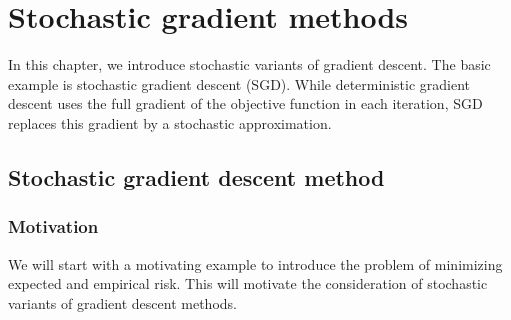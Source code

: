 \documentclass[12pt,openany]{book}
\theoremstyle{definition}
\theoremstyle{definition}
\begin{document}
\chapter{Stochastic gradient methods}\label{ch:sgd}
In this chapter, we introduce stochastic variants of gradient descent. The basic example is stochastic gradient descent (SGD). While deterministic gradient descent uses the full gradient of
the objective function in each iteration, SGD replaces this gradient by a stochastic approximation.

\section{Stochastic gradient descent method}
\subsection{Motivation}
We will start with a motivating example to introduce the problem of minimizing expected and empirical risk. This will motivate the consideration of stochastic variants of gradient descent methods.
\end{document}

